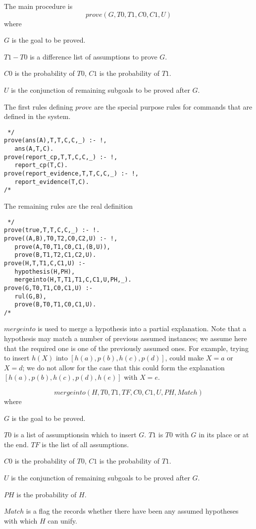 The main procedure is 
\[prove(G,T0,T1,C0,C1,U)\]
where
\begin{description}
\item $G$ is the goal to be proved.
\item $T1-T0$ is a difference list of assumptions to prove $G$.
\item $C0$ is the probability of $T0$, $C1$ is the probability of $T1$.
\item $U$ is the conjunction of remaining subgoals to be proved after $G$.
\end{description}
The first rules defining $prove$ are the special purpose rules
for commands that are defined in the system.
\begin{verbatim} */
prove(ans(A),T,T,C,C,_) :- !,
   ans(A,T,C).
prove(report_cp,T,T,C,C,_) :- !,
   report_cp(T,C).
prove(report_evidence,T,T,C,C,_) :- !,
   report_evidence(T,C).
/* \end{verbatim}

The remaining rules are the real definition
\begin{verbatim} */
prove(true,T,T,C,C,_) :- !.
prove((A,B),T0,T2,C0,C2,U) :- !,
   prove(A,T0,T1,C0,C1,(B,U)),
   prove(B,T1,T2,C1,C2,U).
prove(H,T,T1,C,C1,U) :-
   hypothesis(H,PH),
   mergeinto(H,T,T1,T1,C,C1,U,PH,_).
prove(G,T0,T1,C0,C1,U) :-
   rul(G,B),
   prove(B,T0,T1,C0,C1,U).
/* \end{verbatim}

$mergeinto$ is used to merge a hypothesis into a partial explanation.
Note that a hypothesis may match a number of previous assumed instances;
we assume here that the required one is one of the previously assumed ones.
For example, trying to insert $h(X)$ into $[h(a),p(b),h(c),p(d)]$, could make
$X=a$ or $X=d$; we do not allow for the case that this could form the 
explanation $[h(a),p(b),h(c),p(d),h(e)]$ with $X=e$.

\[mergeinto(H,T0,T1,TF,C0,C1,U,PH,Match)\]
where
\begin{description}
\item $G$ is the goal to be proved.
\item $T0$ is a list of assumptionsin which to insert $G$. $T1$ is $T0$
with $G$ in its place or at the end.
$TF$ is the list of all assumptions.
\item $C0$ is the probability of $T0$, $C1$ is the probability of $T1$.
\item $U$ is the conjunction of remaining subgoals to be proved after $G$.
\item $PH$ is the probability of $H$.
\item $Match$ is a flag the records whether there have been any assumed
hypotheses with which $H$ can unify.
\end{description}

